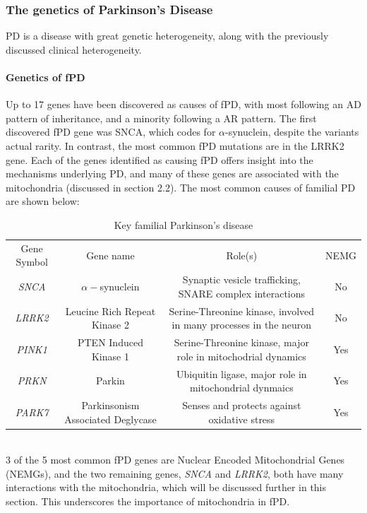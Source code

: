 \documentclass{article}
\begin{document}
\begin{landscape}
\subsubsection{The genetics of Parkinson’s Disease}
PD is a disease with great genetic heterogeneity, along with the previously discussed clinical heterogeneity. 
\paragraph{Genetics of fPD}Up to 17 genes have been discovered as causes of fPD\cite{Day2021ThePractice}, with most following an AD pattern of inheritance, and a minority following a AR pattern. The first discovered fPD gene was SNCA, which codes for $\alpha$-synuclein, despite the variants actual rarity. In contrast, the most common fPD mutations are in the LRRK2 gene\cite{Klein2012GeneticsDisease}. Each of the genes identified as causing fPD offers insight into the mechanisms underlying PD, and many of these genes are associated with the mitochondria (discussed in section 2.2). The most common causes of familial PD are shown below:
\begin{table}[h]
    \hskip-0.5cm
    \begin{tabular}{ |c|c|c|c| }
        \hline
        Gene Symbol & Gene name & Role(s) & NEMG \\
        \textit{SNCA} & $\alpha-$synuclein & Synaptic vesicle trafficking, SNARE complex interactions & No \\
        \textit{LRRK2} & Leucine Rich Repeat Kinase 2 & Serine-Threonine kinase, involved in many processes in the neuron & No \\
        \textit{PINK1} & PTEN Induced Kinase 1 & Serine-Threonine kinase, major role in mitochodrial dynamics & Yes\\
        \textit{PRKN} & Parkin & Ubiquitin ligase, major role in mitochondrial dynmaics & Yes\\
        \textit{PARK7} & Parkinsonism Associated Deglycase & Senses and protects against oxidative stress & Yes\\
         \hline
    \end{tabular}
    \caption{Key familial Parkinson's disease}
    \label{tab:my_label}
\end{table}
\\3 of the 5 most common fPD genes are Nuclear Encoded Mitochondrial Genes (NEMGs), and the two remaining genes, \textit{SNCA} and \textit{LRRK2}, both have many interactions with the mitochondria, which will be discussed further in this section. This underscores the importance of mitochondria in fPD.
\end{landscape}
\end{document}

